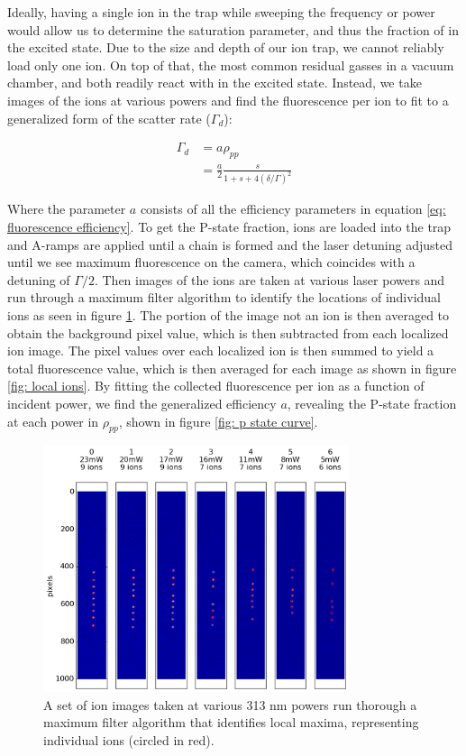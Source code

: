 Ideally, having a single ion in the trap while sweeping the frequency or power would allow us to determine the saturation parameter, and thus the fraction of  in the excited  state. Due to the size and depth of our ion trap, we cannot reliably load only one ion. On top of that, the most common residual gasses in a vacuum chamber,  and  both readily react with  in the excited state. Instead, we take images of the ions at various powers and find the fluorescence per ion to fit to a generalized form of the scatter rate ($\Gamma_d$):

\begin{align}
	\Gamma_d & = a \rho_{pp} \nonumber \\
	& = \frac{a}{2}\frac{s}{1+s+4(\delta/\Gamma)^2} \label{eq: fluor fit}
\end{align}

Where the parameter $a$ consists of all the efficiency parameters in equation \ref{eq: fluorescence efficiency}. To get the P-state fraction,  ions are loaded into the trap and A-ramps are applied until a chain is formed and the laser detuning adjusted until we see maximum fluorescence on the camera, which coincides with a detuning of $\Gamma/2$. Then images of the ions are taken at various laser powers and run through a maximum filter algorithm to identify the locations of individual ions as seen in figure \ref{fig: ion image set}. The portion of the image not an ion is then averaged to obtain the background pixel value, which is then subtracted from each localized ion image. The pixel values over each localized ion is then summed to yield a total fluorescence value, which is then averaged for each image as shown in figure \ref{fig: local ions}. By fitting the collected fluorescence per ion as a function of incident power, we find the generalized efficiency $a$, revealing the P-state fraction at each power in $\rho_{pp}$, shown in figure \ref{fig: p state curve}.

\begin{figure}[H]
	\centering
	\includegraphics[width=0.8\textwidth]{images/ion_images.png}
	\caption{A set of ion images taken at various 313 nm powers run thorough a maximum filter algorithm that identifies local maxima, representing individual ions (circled in red).}
	\label{fig: ion image set}
\end{figure}

